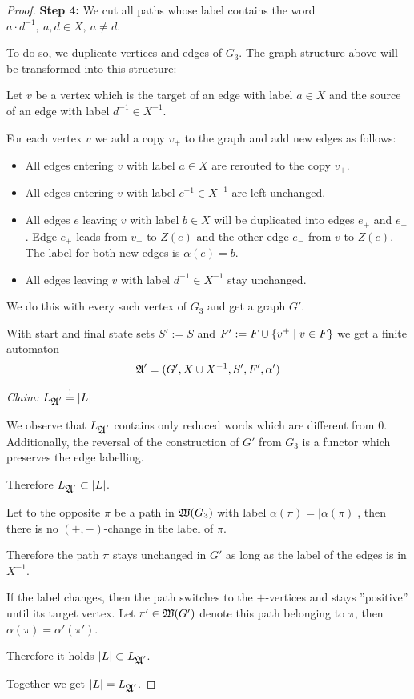 \begin{proof}
\medskip
{\bf Step 4:} We cut all paths whose label contains the word $a \cdot
d^{-1},\ a, d \in X,\ a \neq d$.

\begin{center}

\end{center}

To do so, we duplicate vertices and edges of $G_3$. The graph structure
above will be transformed into this structure:

\begin{center}

\end{center}

Let $v$ be a vertex which is the target of an edge with label $a \in X$ and the
source of an edge with label $d^{-1} \in X^{-1}$.

For each vertex $v$ we add a copy $v_{+}$ to the graph and add new edges as
follows:
\begin{itemize}
  \item All edges entering $v$ with label $a \in X$ are rerouted to the copy
  $v_{+}$.
  \item All edges entering $v$ with label $c^{-1} \in X^{-1}$ are left
  unchanged.
  \item All edges $e$ leaving $v$ with label $b \in X$ will be
  duplicated into edges $e_{+}$ and $e_{-}$. Edge $e_{+}$ leads from $v_{+}$
  to $Z(e)$ and the other edge $e_{-}$ from $v$ to $Z(e)$. The label for
  both new edges is $\alpha(e) = b$.
	\item All edges leaving $v$ with label $d^{-1} \in X^{-1}$ stay unchanged.
\end{itemize}
We do this with every such vertex of $G_3$ and get a graph $G'$.

With start and final state sets $S' := S$ and $F' := F \cup \mbox{$\{v^+ \mid v
\in F\}$}$ we get a finite automaton
\[ \mbox{$\mathfrak{A}$}' = (G', X \cup {X}^{-1}, S', F', \alpha') \]

{\em Claim:} $L_{\mbox{$\mathfrak{A}$}'} \stackrel{!}{=} |L|$

We observe that $L_{\mbox{$\mathfrak{A}$}'}$ contains only reduced words which are different
from $0$. Additionally, the reversal of the construction of $G'$ from $G_3$ is a
functor which preserves the edge labelling.

Therefore $L_{\mbox{$\mathfrak{A}$}'} \subset |L|$.

\bigskip
Let to the opposite $\pi$ be a path in $\mbox{$\mathfrak{W}({G_3})$}$ with label $\alpha(\pi)
= |\alpha(\pi)|$, then there is no $(+, -)$-change in the label of $\pi$.

Therefore the path $\pi$ stays unchanged in $G'$ as long as the label
of the edges is in $X^{-1}$.

If the label changes, then the path switches to the $+$-vertices and stays
''positive'' until its target vertex. Let $\pi' \in \mbox{$\mathfrak{W}({G'})$}$ denote this
path belonging to $\pi$, then $\alpha(\pi) = \alpha'(\pi')$.

Therefore it holds $|L| \subset L_{\mbox{$\mathfrak{A}$}'}$.

\medskip
Together we get $|L| = L_{\mbox{$\mathfrak{A}$}'}$.
\end{proof}

